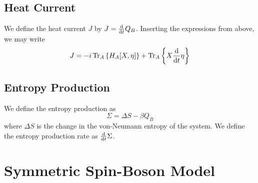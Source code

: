 \documentclass{article}
\newcommand{\Ptra}[2]{\Tr_{#1}\left\{#2\right\}}
\begin{document}
\subsection{Heat Current}

We define the heat current $J$ by $J = \dv{t}Q_B$. Inserting the expressions from above, we may write
\begin{equation}
    J = -i\Ptra{A}{H_A\comm{X}{\eta}}+\Ptra{A}{X\dv{t}\eta}
\end{equation}

\subsection{Entropy Production}

We define the entropy production as
\begin{equation}
    \Sigma = \Delta S - \beta Q_B
\end{equation}
where $\Delta S$ is the change in the von-Neumann entropy of the system. We define the entropy production rate as $\dv{t}\Sigma$.

\section{Symmetric Spin-Boson Model}
\end{document}

